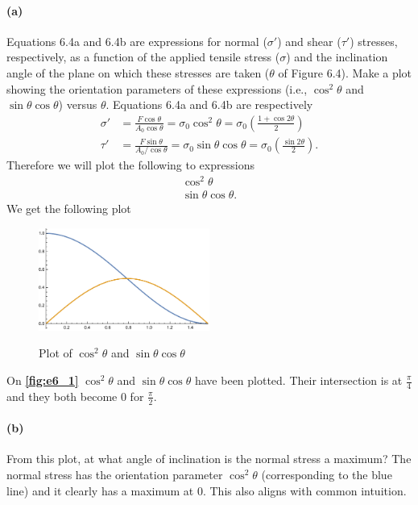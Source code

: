 

\paragraph{(a)} Equations 6.4a and 6.4b are expressions for normal ($\sigma'$) and shear ($\tau'$) stresses, respectively, as a function of the applied tensile stress ($\sigma$) and the inclination angle of the plane on which these stresses are taken ($\theta$ of Figure 6.4). Make a plot showing the orientation parameters of these expressions (i.e., $\cos^2 \theta$ and $\sin \theta \cos \theta$) versus $\theta$.
\bigbreak
Equations 6.4a and 6.4b are respectively
\begin{align*}
  \sigma' &= \frac{F \cos\theta}{A_0 \cos\theta} = \sigma_0 \cos^2 \theta = \sigma_0 \left( \frac{1 + \cos 2 \theta}{2} \right) \\
  \tau' &= \frac{F \sin\theta}{A_0 / \cos\theta} = \sigma_0 \sin\theta \cos\theta = \sigma_0 \left( \frac{\sin 2\theta}{2} \right)
.\end{align*}
Therefore we will plot the following to expressions
\begin{gather*}
  \cos^2 \theta \\
  \sin\theta \cos\theta
.\end{gather*}
We get the following plot
\begin{figure} [ht]
  \centering
  \caption{Plot of $\cos^2 \theta$ and $\sin\theta \cos\theta$}
  \includegraphics[width=0.5\textwidth]{plot_20250212_154046.pdf}
  \label{fig:e6_1}
\end{figure}
On \textbf{\autoref{fig:e6_1}} $\cos^2 \theta$ and $\sin\theta \cos\theta$ have been plotted. Their intersection is at $\frac{\pi}{4}$ and they both become 0 for $\frac{\pi}{2}$.

\paragraph{(b)} From this plot, at what angle of inclination is the normal stress a maximum?
\bigbreak
The normal stress has the orientation parameter $\cos^2 \theta$ (corresponding to the blue line) and it clearly has a maximum at 0. This also aligns with common intuition.

